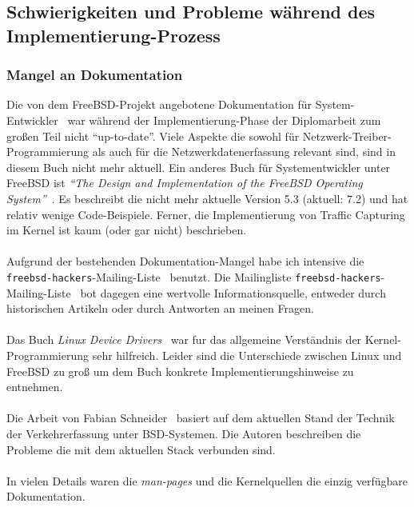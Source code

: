 \subsection{Schwierigkeiten und Probleme während des Implementierung-Prozess}
\subsubsection{Mangel an Dokumentation}
Die von dem FreeBSD-Projekt angebotene Dokumentation für
System-Entwickler~\cite{bsd_sys_arch} war während der Implementierung-Phase der
Diplomarbeit zum großen Teil nicht ``up-to-date''. Viele Aspekte die sowohl für
Netzwerk-Treiber-Programmierung als auch für die Netzwerkdatenerfassung
relevant sind, sind in diesem Buch nicht mehr aktuell. Ein anderes Buch für
Systementwickler unter FreeBSD ist \emph{``The Design and Implementation of the
FreeBSD Operating System''}~\cite{freebsd_design}.  Es beschreibt die nicht
mehr aktuelle Version 5.3 (aktuell: 7.2) und hat relativ wenige Code-Beispiele.
Ferner, die Implementierung von Traffic Capturing im Kernel ist kaum (oder gar
nicht) beschrieben.\\\\
Aufgrund der bestehenden Dokumentation-Mangel habe ich intensive die
\verb+freebsd-hackers+-Mailing-Liste~\cite{mail_list_bsd_hackers} benutzt.  Die
Mailingliste \verb+freebsd-hackers+-Mailing-Liste~\cite{mail_list_bsd_hackers}
bot dagegen eine wertvolle Informationsquelle, entweder durch historischen
Artikeln oder durch Antworten an meinen Fragen.\\\\
%
Das Buch \emph{Linux Device Drivers}~\cite{ldd_book} war fur das allgemeine
Verständnis der Kernel-Programmierung sehr hilfreich. Leider sind die Unterschiede
zwischen Linux und FreeBSD zu groß um dem Buch konkrete Implementierungshinweise
zu entnehmen.\\\\
%
Die Arbeit von Fabian Schneider~\cite{fabian_da,pcin10gb_paper} basiert auf dem
aktuellen Stand der Technik der Verkehrerfassung unter BSD-Systemen.  Die
Autoren beschreiben die Probleme die mit dem aktuellen Stack verbunden
sind.\\\\
%
In vielen Details waren die \emph{man-pages} und die Kernelquellen die einzig
verfügbare Dokumentation.

